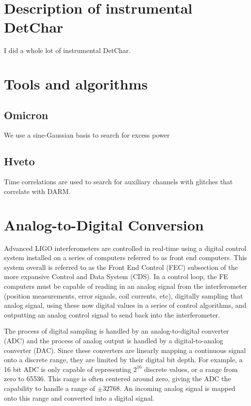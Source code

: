 \section{Description of instrumental DetChar}

I did a whole lot of instrumental DetChar.

\section{Tools and algorithms}

\subsection{Omicron}

We use a sine-Gaussian basis to search for excess power

\subsection{Hveto}

Time correlations are used to search for auxiliary channels with glitches that 
correlate with DARM.

\section{Analog-to-Digital Conversion}

Advanced LIGO interferometers are controlled in real-time using a digital control system installed on a series of computers referred to as front end computers.  This system overall is referred to as the Front End Control (FEC) subsection of the more expansive Control and Data System (CDS).  In a control loop, the FE computers must be capable of reading in an analog signal from the interferometer (position measurements, error signals, coil currents, etc), digitally sampling that analog signal, using these now digital values in a series of control algorithms, and outputting an analog control signal to send back into the interferometer.

The process of digital sampling is handled by an analog-to-digital converter (ADC) and the process of analog output is handled by a digital-to-analog converter (DAC).  Since these converters are linearly mapping a continuous signal onto a discrete range, they are limited by their digital bit depth.  For example, a 16 bit ADC is only capable of representing $2^{16}$ discrete values, or a range from zero to 65536.  This range is often centered around zero, giving the ADC the capability to handle a range of $\pm32768$.  An incoming analog signal is mapped onto this range and converted into a digital signal.

